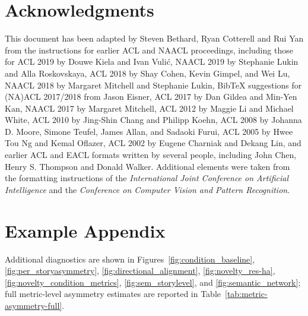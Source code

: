 \documentclass[11pt]{article}
\begin{document}

\section*{Acknowledgments}

This document has been adapted
by Steven Bethard, Ryan Cotterell and Rui Yan
from the instructions for earlier ACL and NAACL proceedings, including those for
ACL 2019 by Douwe Kiela and Ivan Vuli\'{c},
NAACL 2019 by Stephanie Lukin and Alla Roskovskaya,
ACL 2018 by Shay Cohen, Kevin Gimpel, and Wei Lu,
NAACL 2018 by Margaret Mitchell and Stephanie Lukin,
Bib\TeX{} suggestions for (NA)ACL 2017/2018 from Jason Eisner,
ACL 2017 by Dan Gildea and Min-Yen Kan,
NAACL 2017 by Margaret Mitchell,
ACL 2012 by Maggie Li and Michael White,
ACL 2010 by Jing-Shin Chang and Philipp Koehn,
ACL 2008 by Johanna D. Moore, Simone Teufel, James Allan, and Sadaoki Furui,
ACL 2005 by Hwee Tou Ng and Kemal Oflazer,
ACL 2002 by Eugene Charniak and Dekang Lin,
and earlier ACL and EACL formats written by several people, including
John Chen, Henry S. Thompson and Donald Walker.
Additional elements were taken from the formatting instructions of the \emph{International Joint Conference on Artificial Intelligence} and the \emph{Conference on Computer Vision and Pattern Recognition}.

%


\appendix

\section{Example Appendix}
\label{sec:appendix}

Additional diagnostics are shown in Figures~\ref{fig:condition_baseline}, \ref{fig:per_storyasymmetry}, \ref{fig:directional_alignment}, \ref{fig:novelty_res-ha}, \ref{fig:novelty_condition_metrics}, \ref{fig:sem_storylevel}, and \ref{fig:semantic_network}; full metric-level asymmetry estimates are reported in Table~\ref{tab:metric-asymmetry-full}.
\end{document}
